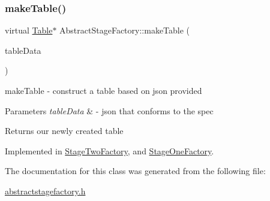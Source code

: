 \subsubsection{\texorpdfstring{make\+Table()}{makeTable()}}
{\footnotesize\ttfamily virtual \mbox{\hyperlink{class_table}{Table}}$\ast$ Abstract\+Stage\+Factory\+::make\+Table (\begin{DoxyParamCaption}\item[{const Q\+Json\+Object \&}]{table\+Data }\end{DoxyParamCaption})\hspace{0.3cm}{\ttfamily [pure virtual]}}



make\+Table -\/ construct a table based on json provided 


\begin{DoxyParams}{Parameters}
{\em table\+Data} & -\/ json that conforms to the spec \\
\hline
\end{DoxyParams}
\begin{DoxyReturn}{Returns}
our newly created table 
\end{DoxyReturn}


Implemented in \mbox{\hyperlink{class_stage_two_factory_aa532818e02bed0ea1f5c79a1a1487e71}{Stage\+Two\+Factory}}, and \mbox{\hyperlink{class_stage_one_factory_a31e02c98e5c428f0e1ac0a36e641310d}{Stage\+One\+Factory}}.



The documentation for this class was generated from the following file\+:\begin{DoxyCompactItemize}
\item 
\mbox{\hyperlink{abstractstagefactory_8h}{abstractstagefactory.\+h}}\end{DoxyCompactItemize}

